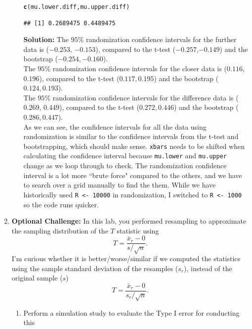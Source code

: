 \documentclass{article}\usepackage[]{graphicx}\usepackage[]{xcolor}
\makeatletter
\newcommand{\hldef}[1]{\textcolor[rgb]{0.345,0.345,0.345}{#1}}%
\newcommand{\hlkwd}[1]{\textcolor[rgb]{0.737,0.353,0.396}{\textbf{#1}}}%
\newenvironment{kframe}{%
 \def\at@end@of@kframe{}%
 \ifinner\ifhmode%
  \def\at@end@of@kframe{\end{minipage}}%
  \begin{minipage}{\columnwidth}%
 \fi\fi%
 \def\FrameCommand##1{\hskip\@totalleftmargin \hskip-\fboxsep
 \colorbox{shadecolor}{##1}\hskip-\fboxsep
     \hskip-\linewidth \hskip-\@totalleftmargin \hskip\columnwidth}%
 \MakeFramed {\advance\hsize-\width
   \@totalleftmargin\z@ \linewidth\hsize
   \@setminipage}}%
 {\par\unskip\endMakeFramed%
 \at@end@of@kframe}
\newenvironment{knitrout}{}{} %
\makeatother
\begin{document}
\begin{enumerate}
\begin{enumerate}
\begin{knitrout}
\begin{kframe}
\begin{alltt}
\hlkwd{c}\hldef{(mu.lower.diff, mu.upper.diff)}
\end{alltt}
\begin{verbatim}
## [1] 0.2689475 0.4489475
\end{verbatim}
\end{kframe}
\end{knitrout}
  \textbf{Solution:} The $95\%$ randomization confidence intervals for the further data is ($-0.253$, $-0.153$), compared to the t-test ($-0.257$,$-0.149$) and the bootstrap ($-0.254, -0.160$).\\
  The $95\%$ randomization confidence intervals for the closer data is ($0.116$, $0.196$), compared to the t-test ($0.117, 0.195$) and the bootstrap ($0.124, 0.193$).\\
  The $95\%$ randomization confidence intervals for the difference data is ($0.269$, $0.449$), compared to the t-test ($0.272, 0.446$) and the bootstrap ($0.286, 0.447$). \\
  As we can see, the confidence intervals for all the data using randomization is similar to the confidence intervals from the t-test and bootstrapping, which should make sense. \texttt{xbars} needs to be shifted when calculating the confidence interval because \verb|mu.lower| and \verb|mu.upper| change as we loop through to check. The randomization confidence interval is a lot more ``brute force" compared to the others, and we have to search over a grid manually to find the them. While we have historically used \verb|R <- 10000| in randomization, I switched to \verb|R <- 1000| so the code runs quicker.  
\end{enumerate}
\item \textbf{Optional Challenge:} In this lab, you performed resampling to 
approximate the sampling distribution of the $T$ statistic using
\[T = \frac{\bar{x}_r - 0}{s/\sqrt{n}}.\]
I'm curious whether it is better/worse/similar if we computed the statistics
using the sample standard deviation of the resamples ($s_r$), instead of the 
original sample ($s$)
  \[T = \frac{\bar{x}_r - 0}{s_r/\sqrt{n}}.\]
\begin{enumerate}
  \item Perform a simulation study to evaluate the Type I error for conducting this

\end{enumerate}
\end{enumerate}
\end{document}

